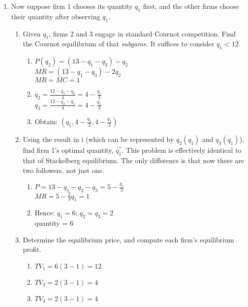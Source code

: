 \documentclass[11pt]{article}
\begin{document}
\begin{enumerate}
\begin{enumerate}
        \item Now suppose firm 1 chooses its quantity $q_{1}$ first, and the other firms choose their quantity after observing $q_{1}$.
            \begin{enumerate}
                \item Given $q_{1}$, firms 2 and 3 engage in standard Cournot competition. Find the Cournot equilibrium of that \emph{subgame}. It suffices to consider $q_{1}<12$.
                \begin{enumerate}
                    \item $P(q_2) = (13-q_1 -q_3) - q_2$\\
                    $MR = (13 - q_1 - q_3) - 2q_2$\\
                    $MR = MC = 1$
                    \item $q_2 = \frac{12 - q_1 - q_2}{4} = 4 -  \frac{q_1}{3}$\\
                    $q_3 = \frac{12-q_2-q_1}{4} = 4 - \frac{q_1}{3}$
                    \item Obtain: $(q_1, 4-\frac{q_1}{3}, 4-\frac{q_1}{3})$
                \end{enumerate}

                \item Using the result in i (which can be represented by $q_{2}(q_{1})$ and $q_{3}(q_{1})$), find firm 1's optimal quantity, $q_{1}^{\ast}$. This problem is effectively identical to that of Stackelberg equilibrium. The only difference is that now there are two followers, not just one.
                \begin{enumerate}
                    \item $P = 13 - q_1 - q_2 - q_3 = 5 - \frac{q_1}{3}$\\
                    $MR = 5 - \frac{2}{3}q_1 = 1$
                    \item Hence: $q_1 = 6$; $q_2 = q_3 = 2$\\
                    quantity = 6
                \end{enumerate}
                
                \item Determine the equilibrium price, and compute each firm's equilibrium profit.
                \begin{enumerate}
                    \item $TV_1 = 6(3-1) = 12$
                    \item $TV_2 = 2(3-1) = 4$
                    \item $TV_3 = 2(3-1) = 4$
                \end{enumerate}
                

\end{enumerate}
\end{enumerate}
\end{enumerate}
\end{document}

